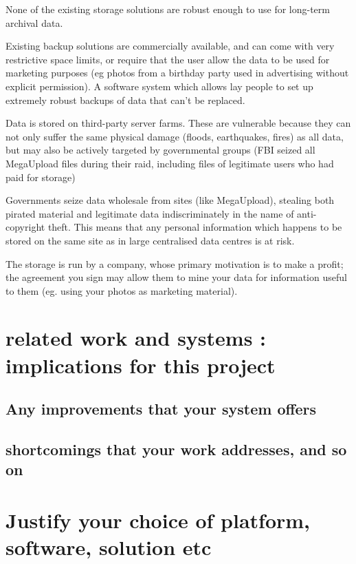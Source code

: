 \documentclass[12pt,a4paper,]{adreport}
\begin{document}
None of the existing storage solutions are robust enough to use for
long-term archival data.

Existing backup solutions are commercially available, and can come with
very restrictive space limits, or require that the user allow the data
to be used for marketing purposes (eg photos from a birthday party used
in advertising without explicit permission). A software system which
allows lay people to set up extremely robust backups of data that can't
be replaced.

Data is stored on third-party server farms. These are vulnerable because
they can not only suffer the same physical damage (floods, earthquakes,
fires) as all data, but may also be actively targeted by governmental
groups (FBI seized all MegaUpload files during their raid, including
files of legitimate users who had paid for storage)

Governments seize data wholesale from sites (like MegaUpload), stealing
both pirated material and legitimate data indiscriminately in the name
of anti-copyright theft. This means that any personal information which
happens to be stored on the same site as in large centralised data
centres is at risk.

The storage is run by a company, whose primary motivation is to make a
profit; the agreement you sign may allow them to mine your data for
information useful to them (eg. using your photos as marketing
material).

\section{related work and systems : implications for this
project}\label{related-work-and-systems-implications-for-this-project}

\subsection{Any improvements that your system
offers}\label{any-improvements-that-your-system-offers}

\subsection{shortcomings that your work addresses, and so
on}\label{shortcomings-that-your-work-addresses-and-so-on}

\section{Justify your choice of platform, software, solution
etc}\label{justify-your-choice-of-platform-software-solution-etc}
\end{document}
